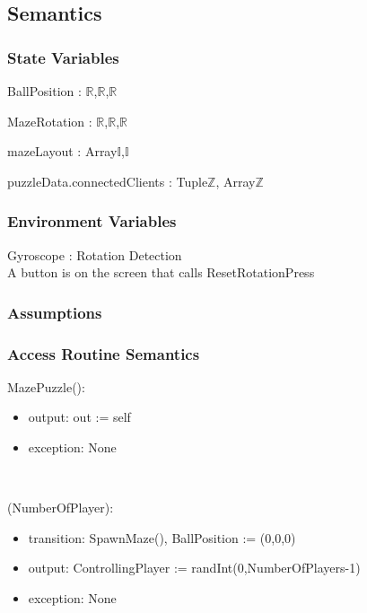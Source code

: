 \documentclass[12pt, titlepage]{article}
\begin{document}
\subsection{Semantics}

\subsubsection{State Variables}

BallPosition : {$\mathbb{R}$,$\mathbb{R}$,$\mathbb{R}$}

\noindent MazeRotation : {$\mathbb{R}$,$\mathbb{R}$,$\mathbb{R}$}

\noindent mazeLayout : Array\textlangle$\mathds{I}$,$\mathds{I}$\textrangle

\noindent puzzleData.connectedClients : Tuple\textlangle$\mathds{Z}$, Array\textlangle$\mathds{Z}$\textrangle\textrangle



\subsubsection{Environment Variables}

Gyroscope : Rotation Detection\\

\noindent A button is on the screen that calls ResetRotationPress

\subsubsection{Assumptions}

\subsubsection{Access Routine Semantics}

\noindent MazePuzzle():
\begin{itemize}
\item output: out := self
\item exception: None
\end{itemize}\

(NumberOfPlayer):
\begin{itemize}
\item transition: SpawnMaze(), BallPosition := (0,0,0)
\item output: ControllingPlayer := randInt(0,NumberOfPlayers-1)
\item exception: None
\end{itemize}
\end{document}
